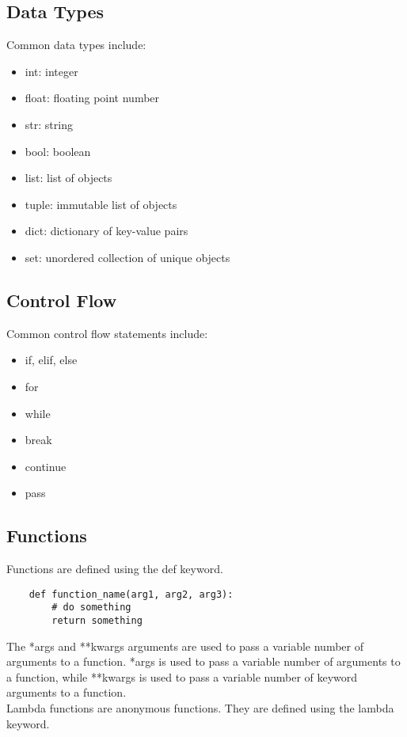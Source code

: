 \documentclass[12pt,a4paper]{article}
\begin{document}
\subsection{Data Types}
Common data types include:
\begin{itemize}
    \item int: integer
    \item float: floating point number
    \item str: string
    \item bool: boolean
    \item list: list of objects
    \item tuple: immutable list of objects
    \item dict: dictionary of key-value pairs
    \item set: unordered collection of unique objects
\end{itemize}

\subsection{Control Flow}
Common control flow statements include:
\begin{itemize}
    \item if, elif, else
    \item for
    \item while
    \item break
    \item continue
    \item pass
\end{itemize}

\subsection{Functions}
Functions are defined using the def keyword.\\
\begin{lstlisting}
    def function_name(arg1, arg2, arg3):
        # do something
        return something
\end{lstlisting}
The *args and **kwargs arguments are used to pass a variable number of arguments to a function. *args is used to pass a variable number of arguments to a function, while **kwargs is used to pass a variable number of keyword arguments to a function.\\

Lambda functions are anonymous functions. They are defined using the lambda keyword.\\
\end{document}

